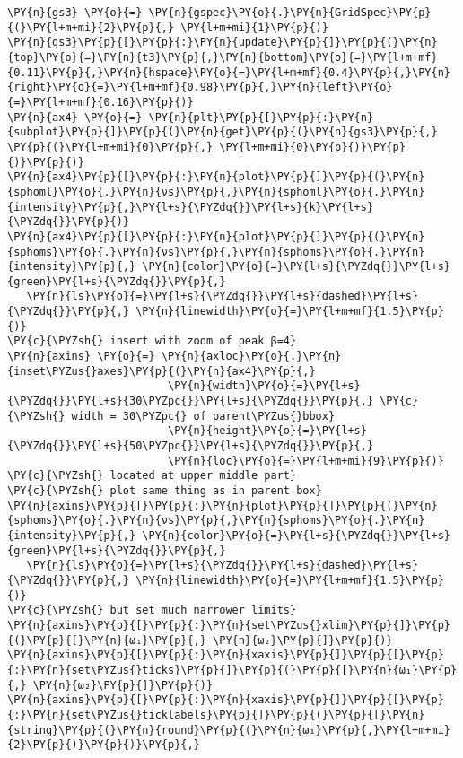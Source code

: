 \begin{Verbatim}[commandchars=\\\{\}]
\PY{n}{gs3} \PY{o}{=} \PY{n}{gspec}\PY{o}{.}\PY{n}{GridSpec}\PY{p}{(}\PY{l+m+mi}{2}\PY{p}{,} \PY{l+m+mi}{1}\PY{p}{)}
\PY{n}{gs3}\PY{p}{[}\PY{p}{:}\PY{n}{update}\PY{p}{]}\PY{p}{(}\PY{n}{top}\PY{o}{=}\PY{n}{t3}\PY{p}{,}\PY{n}{bottom}\PY{o}{=}\PY{l+m+mf}{0.11}\PY{p}{,}\PY{n}{hspace}\PY{o}{=}\PY{l+m+mf}{0.4}\PY{p}{,}\PY{n}{right}\PY{o}{=}\PY{l+m+mf}{0.98}\PY{p}{,}\PY{n}{left}\PY{o}{=}\PY{l+m+mf}{0.16}\PY{p}{)}
\PY{n}{ax4} \PY{o}{=} \PY{n}{plt}\PY{p}{[}\PY{p}{:}\PY{n}{subplot}\PY{p}{]}\PY{p}{(}\PY{n}{get}\PY{p}{(}\PY{n}{gs3}\PY{p}{,} \PY{p}{(}\PY{l+m+mi}{0}\PY{p}{,} \PY{l+m+mi}{0}\PY{p}{)}\PY{p}{)}\PY{p}{)}
\PY{n}{ax4}\PY{p}{[}\PY{p}{:}\PY{n}{plot}\PY{p}{]}\PY{p}{(}\PY{n}{sphoml}\PY{o}{.}\PY{n}{νs}\PY{p}{,}\PY{n}{sphoml}\PY{o}{.}\PY{n}{intensity}\PY{p}{,}\PY{l+s}{\PYZdq{}}\PY{l+s}{k}\PY{l+s}{\PYZdq{}}\PY{p}{)}
\PY{n}{ax4}\PY{p}{[}\PY{p}{:}\PY{n}{plot}\PY{p}{]}\PY{p}{(}\PY{n}{sphoms}\PY{o}{.}\PY{n}{νs}\PY{p}{,}\PY{n}{sphoms}\PY{o}{.}\PY{n}{intensity}\PY{p}{,} \PY{n}{color}\PY{o}{=}\PY{l+s}{\PYZdq{}}\PY{l+s}{green}\PY{l+s}{\PYZdq{}}\PY{p}{,}
   \PY{n}{ls}\PY{o}{=}\PY{l+s}{\PYZdq{}}\PY{l+s}{dashed}\PY{l+s}{\PYZdq{}}\PY{p}{,} \PY{n}{linewidth}\PY{o}{=}\PY{l+m+mf}{1.5}\PY{p}{)}
\PY{c}{\PYZsh{} insert with zoom of peak β=4}
\PY{n}{axins} \PY{o}{=} \PY{n}{axloc}\PY{o}{.}\PY{n}{inset\PYZus{}axes}\PY{p}{(}\PY{n}{ax4}\PY{p}{,}
                         \PY{n}{width}\PY{o}{=}\PY{l+s}{\PYZdq{}}\PY{l+s}{30\PYZpc{}}\PY{l+s}{\PYZdq{}}\PY{p}{,} \PY{c}{\PYZsh{} width = 30\PYZpc{} of parent\PYZus{}bbox}
                         \PY{n}{height}\PY{o}{=}\PY{l+s}{\PYZdq{}}\PY{l+s}{50\PYZpc{}}\PY{l+s}{\PYZdq{}}\PY{p}{,}
                         \PY{n}{loc}\PY{o}{=}\PY{l+m+mi}{9}\PY{p}{)} \PY{c}{\PYZsh{} located at upper middle part}
\PY{c}{\PYZsh{} plot same thing as in parent box}
\PY{n}{axins}\PY{p}{[}\PY{p}{:}\PY{n}{plot}\PY{p}{]}\PY{p}{(}\PY{n}{sphoms}\PY{o}{.}\PY{n}{νs}\PY{p}{,}\PY{n}{sphoms}\PY{o}{.}\PY{n}{intensity}\PY{p}{,} \PY{n}{color}\PY{o}{=}\PY{l+s}{\PYZdq{}}\PY{l+s}{green}\PY{l+s}{\PYZdq{}}\PY{p}{,}
   \PY{n}{ls}\PY{o}{=}\PY{l+s}{\PYZdq{}}\PY{l+s}{dashed}\PY{l+s}{\PYZdq{}}\PY{p}{,} \PY{n}{linewidth}\PY{o}{=}\PY{l+m+mf}{1.5}\PY{p}{)}
\PY{c}{\PYZsh{} but set much narrower limits}
\PY{n}{axins}\PY{p}{[}\PY{p}{:}\PY{n}{set\PYZus{}xlim}\PY{p}{]}\PY{p}{(}\PY{p}{[}\PY{n}{ω₁}\PY{p}{,} \PY{n}{ω₂}\PY{p}{]}\PY{p}{)}
\PY{n}{axins}\PY{p}{[}\PY{p}{:}\PY{n}{xaxis}\PY{p}{]}\PY{p}{[}\PY{p}{:}\PY{n}{set\PYZus{}ticks}\PY{p}{]}\PY{p}{(}\PY{p}{[}\PY{n}{ω₁}\PY{p}{,} \PY{n}{ω₂}\PY{p}{]}\PY{p}{)}
\PY{n}{axins}\PY{p}{[}\PY{p}{:}\PY{n}{xaxis}\PY{p}{]}\PY{p}{[}\PY{p}{:}\PY{n}{set\PYZus{}ticklabels}\PY{p}{]}\PY{p}{(}\PY{p}{[}\PY{n}{string}\PY{p}{(}\PY{n}{round}\PY{p}{(}\PY{n}{ω₁}\PY{p}{,}\PY{l+m+mi}{2}\PY{p}{)}\PY{p}{)}\PY{p}{,}

\end{Verbatim}
